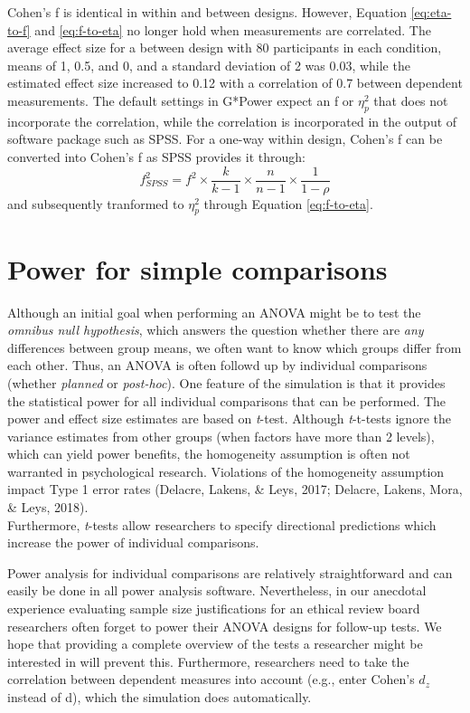 \documentclass[,jou, draftfirst, a4paper,floatsintext]{apa6}
\begin{document}
Cohen's f is identical in within and between designs.
However, Equation \eqref{eq:eta-to-f} and \eqref{eq:f-to-eta} no longer hold when measurements are correlated.
The average effect size for a between design with 80 participants in each condition, means of 1, 0.5, and 0, and a standard deviation of 2 was 0.03, while the estimated effect size increased to 0.12 with a correlation of 0.7 between dependent measurements.
The default settings in G*Power expect an f or \(\eta_p^2\) that does not incorporate the correlation, while the correlation is incorporated in the output of software package such as SPSS.
For a one-way within design, Cohen's f can be converted into Cohen's f as SPSS provides it through:
\begin{equation}
f^2_{SPSS} = f^2 \times \frac{k}{k-1} \times \frac{n}{n-1} \times \frac{1}{1-\rho}
\end{equation}
and subsequently tranformed to \(\eta_p^2\) through Equation \eqref{eq:f-to-eta}.

\hypertarget{power-for-simple-comparisons}{%
\section{Power for simple comparisons}\label{power-for-simple-comparisons}}

Although an initial goal when performing an ANOVA might be to test the \emph{omnibus null hypothesis}, which answers the question whether there are \emph{any} differences between group means, we often want to know which groups differ from each other. Thus, an ANOVA is often followd up by individual comparisons (whether \emph{planned} or \emph{post-hoc}).
One feature of the simulation is that it provides the statistical power for all individual comparisons that can be performed.
The power and effect size estimates are based on \emph{t}-test.
Although \emph{t}-t-tests ignore the variance estimates from other groups (when factors have more than 2 levels), which can yield power benefits, the homogeneity assumption is often not warranted in psychological research.
Violations of the homogeneity assumption impact Type 1 error rates (Delacre, Lakens, \& Leys, 2017; Delacre, Lakens, Mora, \& Leys, 2018).\\
Furthermore, \emph{t}-tests allow researchers to specify directional predictions which increase the power of individual comparisons.

Power analysis for individual comparisons are relatively straightforward and can easily be done in all power analysis software.
Nevertheless, in our anecdotal experience evaluating sample size justifications for an ethical review board researchers often forget to power their ANOVA designs for follow-up tests.
We hope that providing a complete overview of the tests a researcher might be interested in will prevent this.
Furthermore, researchers need to take the correlation between dependent measures into account (e.g., enter Cohen's \(d_z\) instead of d), which the simulation does automatically.
\end{document}
